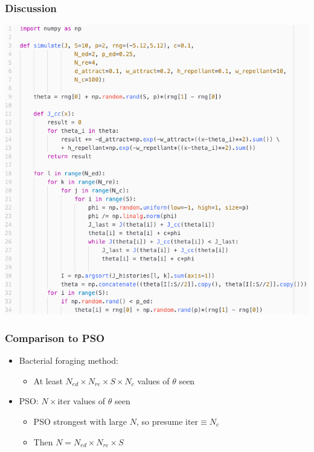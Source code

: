 \documentclass{beamer}
\begin{document}
\begin{frame}
\frametitle{Discussion}
\begin{center}
\includegraphics[scale=0.3]{assets/code}
\end{center}
\end{frame}

\begin{frame}
\frametitle{Comparison to PSO}
\begin{itemize}
  \item Bacterial foraging method:
  \begin{itemize}
    \item   At least $N_{ed} \times N_{re} \times S \times N_c$ values of $\theta$ seen
  \end{itemize}
  \item PSO: $N \times \text{iter}$ values of $\theta$ seen
  \begin{itemize}
    \item PSO strongest with large $N$, so presume $\text{iter} \equiv N_c$
    \item Then $N = N_{ed} \times N_{re} \times S$
  \end{itemize}
\end{itemize}
\end{frame}
\end{document}
